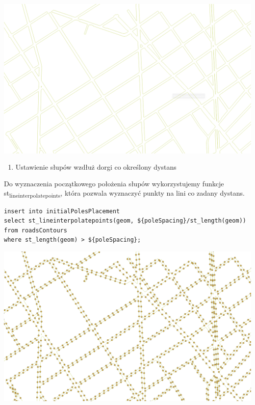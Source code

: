 \documentclass[11pt]{article}
\begin{document}
\begin{center}
\includegraphics[width=.9\linewidth]{./img/2.png}
\end{center}



\begin{enumerate}
\item Ustawienie słupów wzdłuż dorgi co określony dystans
\end{enumerate}

Do wyznaczenia początkowego położenia słupów wykorzystujemy funkcje st\textsubscript{lineinterpolatepoints}, która pozwala wyznaczyć punkty na lini co zadany dystans. 

\begin{verbatim}
insert into initialPolesPlacement 
select st_lineinterpolatepoints(geom, ${poleSpacing}/st_length(geom)) 
from roadsContours 
where st_length(geom) > ${poleSpacing};
\end{verbatim}

\begin{center}
\includegraphics[width=.9\linewidth]{./img/3.png}
\end{center}
\end{document}
